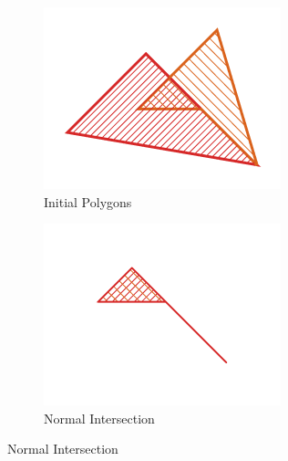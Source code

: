 \documentclass[a4paper,11pt,oneside]{article}
\begin{document}
 
\begin{figure}[ht]
     \centering
     \begin{subfigure}[b]{0.3\textwidth}
         \centering
         \includegraphics[width=\textwidth]{section3/3.2/regularization-initial.png}
         \caption{Initial Polygons}
         \label{section3.2:initial-intersection}
     \end{subfigure}
     \hfill
     \begin{subfigure}[b]{0.3\textwidth}
         \centering
         \includegraphics[width=\textwidth]{section3/3.2/regularization-non-regular.png}
         \caption{Normal Intersection}
          \label{section3.2:normal-intersection}
     \end{subfigure}

\end{figure}
\end{document}
